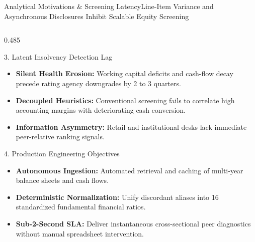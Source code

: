 \begin{frame}{Analytical Motivations \& Screening Latency}{Line-Item Variance and Asynchronous Disclosures Inhibit Scalable Equity Screening}
\begin{columns}[T,onlytextwidth]
        \begin{column}{0.485\textwidth}
            \begin{quantcard}[height=2.74cm]{3. Latent Insolvency Detection Lag}
                \fontsize{5.8pt}{7.0pt}\selectfont
                \begin{itemize}
                    \setlength{\itemsep}{1.5pt}
                    \item \textbf{Silent Health Erosion:} Working capital deficits and cash-flow decay precede rating agency downgrades by 2 to 3 quarters.
                    \item \textbf{Decoupled Heuristics:} Conventional screening fails to correlate high accounting margins with deteriorating cash conversion.
                    \item \textbf{Information Asymmetry:} Retail and institutional desks lack immediate peer-relative ranking signals.
                \end{itemize}
            \end{quantcard}

            \vspace{0.12cm}

            \begin{quantcard}[height=2.74cm]{4. Production Engineering Objectives}
                \fontsize{5.8pt}{7.0pt}\selectfont
                \begin{itemize}
                    \setlength{\itemsep}{1.5pt}
                    \item \textbf{Autonomous Ingestion:} Automated retrieval and caching of multi-year balance sheets and cash flows.
                    \item \textbf{Deterministic Normalization:} Unify discordant aliases into 16 standardized fundamental financial ratios.
                    \item \textbf{Sub-2-Second SLA:} Deliver instantaneous cross-sectional peer diagnostics without manual spreadsheet intervention.
                \end{itemize}
            \end{quantcard}
        \end{column}
    \end{columns}
\end{frame}
